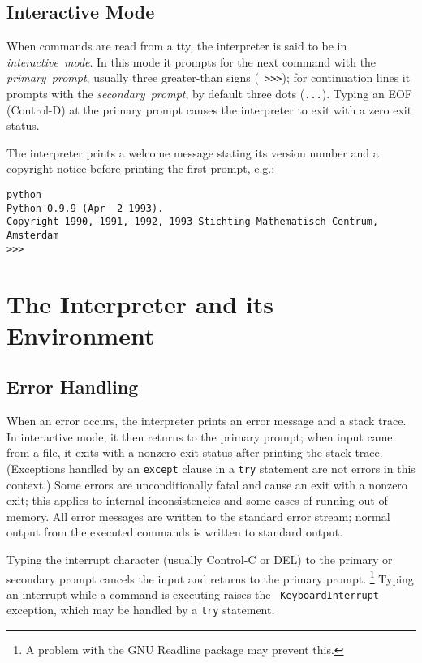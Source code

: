 \subsection{Interactive Mode}

When commands are read from a tty, the interpreter is said to be in
{\em interactive\ mode}.  In this mode it prompts for the next command
with the {\em primary\ prompt}, usually three greater-than signs ({\tt
>>>}); for continuation lines it prompts with the {\em secondary\
prompt}, by default three dots ({\tt ...}).  Typing an EOF (Control-D)
at the primary prompt causes the interpreter to exit with a zero exit
status.

The interpreter prints a welcome message stating its version number
and a copyright notice before printing the first prompt, e.g.:

\bcode\begin{verbatim}
python
Python 0.9.9 (Apr  2 1993).
Copyright 1990, 1991, 1992, 1993 Stichting Mathematisch Centrum, Amsterdam
>>>
\end{verbatim}\ecode

\section{The Interpreter and its Environment}

\subsection{Error Handling}

When an error occurs, the interpreter prints an error
message and a stack trace.  In interactive mode, it then returns to
the primary prompt; when input came from a file, it exits with a
nonzero exit status after printing
the stack trace.  (Exceptions handled by an {\tt except} clause in a
{\tt try} statement are not errors in this context.)  Some errors are
unconditionally fatal and cause an exit with a nonzero exit; this
applies to internal inconsistencies and some cases of running out of
memory.  All error messages are written to the standard error stream;
normal output from the executed commands is written to standard
output.

Typing the interrupt character (usually Control-C or DEL) to the
primary or secondary prompt cancels the input and returns to the
primary prompt.%
\footnote{
	A problem with the GNU Readline package may prevent this.
}
Typing an interrupt while a command is executing raises the {\tt
KeyboardInterrupt} exception, which may be handled by a {\tt try}
statement.

